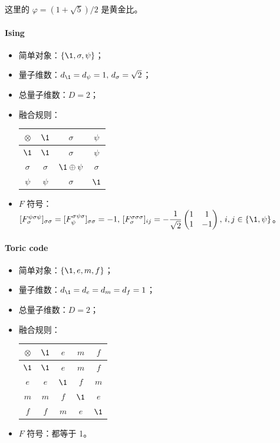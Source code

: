 这里的 $\varphi=(1+\sqrt5)/2$ 是黄金比\cite{trebst2008short}。

\paragraph{Ising}

\begin{itemize}
  \item 简单对象：$\{\1, \sigma, \psi\}$；
  \item 量子维数：$d_{\1}=d_\psi=1, \, d_\sigma=\sqrt2$；
  \item 总量子维数：$D=2$；
  \item 融合规则：
    \begin{tabular}{|c|ccc|}
      \hline
      $\otimes$ & $\1$     & $\sigma$       & $\psi$   \\
      \hline
      $\1$      & $\1$     & $\sigma$       & $\psi$   \\
      $\sigma$  & $\sigma$ & $\1\oplus\psi$ & $\sigma$ \\
      $\psi$    & $\psi$   & $\sigma$       & $\1$     \\
      \hline
    \end{tabular}
  \item $F$ 符号：
    $
      [F^{\psi\sigma\psi}_\sigma]_{\sigma\sigma} = [F^{\sigma\psi\sigma}_\psi]_{\sigma\sigma} = -1, \,
      [F^{\sigma\sigma\sigma}_\sigma]_{ij} = -\dfrac{1}{\sqrt2} \begin{pmatrix} 1 & 1 \\ 1 & -1 \end{pmatrix}, \,
      i,j \in \{\1, \psi\}
    $。
\end{itemize}

\paragraph{Toric code}

\begin{itemize}
  \item 简单对象：$\{\1, e, m, f\}$；
  \item 量子维数：$d_{\1}=d_e=d_m=d_f=1$；
  \item 总量子维数：$D=2$；
  \item 融合规则：
    \begin{tabular}{|c|cccc|}
      \hline
      $\otimes$ & $\1$ & $e$  & $m$  & $f$  \\
      \hline
      $\1$      & $\1$ & $e$  & $m$  & $f$  \\
      $e$       & $e$  & $\1$ & $f$  & $m$  \\
      $m$       & $m$  & $f$  & $\1$ & $e$  \\
      $f$       & $f$  & $m$  & $e$  & $\1$ \\
      \hline
    \end{tabular}
  \item $F$ 符号：都等于 1。
\end{itemize}

